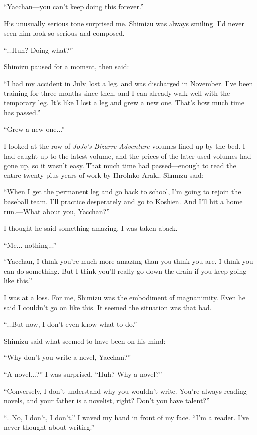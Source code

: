 \documentclass[
    a4paper,
    12pt,
    twoside,
    openany,
    UTF8,
    fontset=windows
]{ctexbook}
\begin{document}
``Yacchan---you can't keep doing this forever.''

His unusually serious tone surprised me. Shimizu was always smiling. I'd never seen him look so serious and composed.

``...Huh? Doing what?''

Shimizu paused for a moment, then said:

``I had my accident in July, lost a leg, and was discharged in November. I've been training for three months since then, and I can already walk well with the temporary leg. It's like I lost a leg and grew a new one. That's how much time has passed.''

``Grew a new one...''

I looked at the row of \textit{JoJo's Bizarre Adventure} volumes lined up by the bed. I had caught up to the latest volume, and the prices of the later used volumes had gone up, so it wasn't easy. That much time had passed—enough to read the entire twenty-plus years of work by Hirohiko Araki. Shimizu said:

``When I get the permanent leg and go back to school, I'm going to rejoin the baseball team. I'll practice desperately and go to Koshien. And I'll hit a home run.---What about you, Yacchan?''

I thought he said something amazing. I was taken aback.

``Me... nothing...''

``Yacchan, I think you're much more amazing than you think you are. I think you can do something. But I think you'll really go down the drain if you keep going like this.''

I was at a loss. For me, Shimizu was the embodiment of magnanimity. Even he said I couldn't go on like this. It seemed the situation was that bad.

``...But now, I don't even know what to do.''

Shimizu said what seemed to have been on his mind:

``Why don't you write a novel, Yacchan?''

``A novel...?'' I was surprised. ``Huh? Why a novel?''

``Conversely, I don't understand why you wouldn't write. You're always reading novels, and your father is a novelist, right? Don't you have talent?''

``...No, I don't, I don't.'' I waved my hand in front of my face. ``I'm a reader. I've never thought about writing.''
\end{document}
